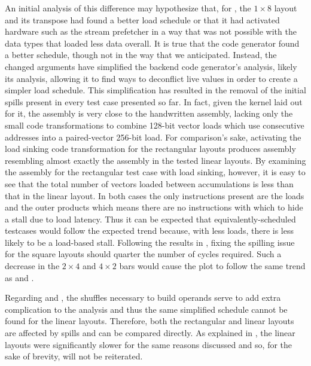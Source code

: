 \documentclass[\main/thesis.tex]{subfiles}
\begin{document}
An initial analysis of this difference may hypothesize that, for , the $1 \times 8$ layout and its transpose had found a better load schedule or that it had activated hardware such as the stream prefetcher in a way that was not possible with the data types that loaded less data overall.
It is true that the code generator found a better schedule, though not in the way that we anticipated.
Instead, the changed arguments have simplified the backend code generator's analysis, likely its  analysis, 
allowing it to find ways to deconflict \gls{live} values in order to create a simpler load schedule.
This simplification has resulted in the removal of the initial spills present in every test case presented so far.
In fact, given the kernel laid out for it, the assembly is very close to the handwritten assembly, lacking only the small code transformations to combine 128-bit vector loads which use consecutive addresses into a paired-vector 256-bit load.
For comparison's sake, activating the load sinking code transformation for the rectangular layouts produces assembly resembling almost exactly the assembly in the tested linear layouts\footnotemark.
By examining the assembly for the rectangular test case with load sinking, however, it is easy to see that the total number of vectors loaded between accumulations is less than that in the linear layout.
In both cases the only instructions present are the loads and the outer products which means there are no instructions with which to hide a stall due to load latency.
Thus it can be expected that equivalently-scheduled  testcases would follow the expected trend because, with less loads, there is less likely to be a load-based stall.
Following the results in , fixing the spilling issue for the  square layouts should quarter the number of cycles required.
Such a decrease in the $2 \times 4$ and $4 \times 2$ bars would cause the  plot to follow the same trend as  and .

Regarding  and , the shuffles necessary to build operands serve to add extra complication to the  analysis and thus the same simplified schedule cannot be found for the linear layouts.
Therefore, both the rectangular and linear layouts are affected by spills and can be compared directly.
As explained in , the linear layouts were significantly slower for the same reasons discussed and so, for the sake of brevity, will not be reiterated.
\end{document}

